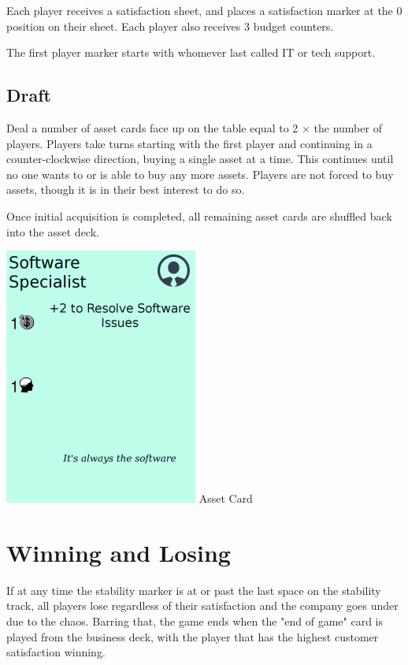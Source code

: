 \documentclass[twocolumn]{article}
\begin{document}
Each player receives a satisfaction sheet, and places a satisfaction marker at the 0 position on their sheet. Each player also receives 3 budget counters.

The first player marker starts with whomever last called IT or tech support.

\subsection*{Draft}

Deal a number of asset cards face up on the table equal to 2 $\times$ the number of players. Players take turns starting with the first player and continuing in a counter-clockwise direction, buying a single asset at a time. This continues until no one wants to or is able to buy any more assets. Players are not forced to buy assets, though it is in their best interest to do so.

Once initial acquisition is completed, all remaining asset cards are shuffled back into the asset deck. \newline

\includegraphics{asset_example}
\newline
\small{Asset Card}

\section*{Winning and Losing}

If at any time the stability marker is at or past the last space on the stability track, all players lose regardless of their satisfaction and the company goes under due to the chaos. Barring that, the game ends when the "end of game" card is played from the business deck, with the player that has the highest customer satisfaction winning.
\end{document}
